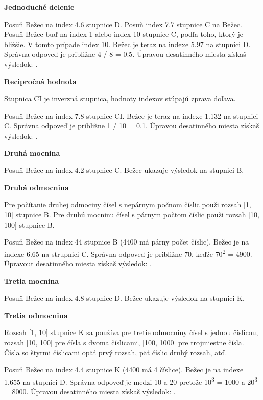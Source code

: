 \begin{multicols*}{3}
{  
  \textbf{Jednoduché delenie}

Posuň Bežec na index 4.6 stupnice D.
Posuň index 7.7 stupnice C na Bežec.
Posuň Bežec buď na index 1 alebo index 10 stupnice C, podľa toho, ktorý je bližšie. V tomto prípade index 10.
Bežec je teraz na indexe 5.97 na stupnici D. Správna odpoveď je približne 4 / 8 = 0.5. Úpravou desatinného miesta získaš výsledok: .

  \textbf{Recipročná hodnota}

\footnotesize Stupnica CI je inverzná stupnica, hodnoty indexov stúpajú zprava doľava. \normalsize

Posuň Bežec na index 7.8 stupnice CI.
Bežec je teraz na indexe 1.132 na stupnici C.
Správna odpoveď je približne 1 / 10 = 0.1. Úpravou desatinného miesta získaš výsledok: .

  \textbf{Druhá mocnina}

Posuň Bežec na index 4.2 stupnice C.
Bežec ukazuje výsledok  na stupnici B.

  \textbf{Druhá odmocnina}

\footnotesize Pre počítanie druhej odmociny čísel s nepárnym počnom číslic použi rozsah [1, 10] stupnice B. Pre druhú mocninu čísel s párnym počtom číslic použi rozsah [10, 100] stupnice B. \normalsize

Posuň Bežec na index 44 stupnice B (4400 má párny počet číslic).
Bežec je na indexe 6.65 na strupnici C. Správna odpoveď je približne 70, keďźe 70\textsuperscript{2} = 4900. Úpravout desatinného miesta získaš výsledok: .

  \textbf{Tretia mocnina}

Posuň Bežec na index 4.8 stupnice D.
Bežec ukazuje výsledok  na stupnici K.

  \textbf{Tretia odmocnina}

\footnotesize Rozsah [1, 10] stupnice K sa používa pre tretie odmocniny čísel s jednou číslicou, rozsah [10, 100] pre čísla s dvoma číslicami, [100, 1000] pre trojmiestne čísla. Čísla so štyrmi číslicami opäť prvý rozsah, päť číslic druhý rozsah, atď. \normalsize

Posuň Bežec na index 4.4 stupnice K (4400 má 4 číslice).
Bežec je na indexe 1.655 na stupnici D.
Správna odpoveď je medzi 10 a 20 pretože 10\textsuperscript{3} = 1000 a 20\textsuperscript{3} = 8000. Úpravou desatinného miesta získaš výsledok: .

}
\end{multicols*}
